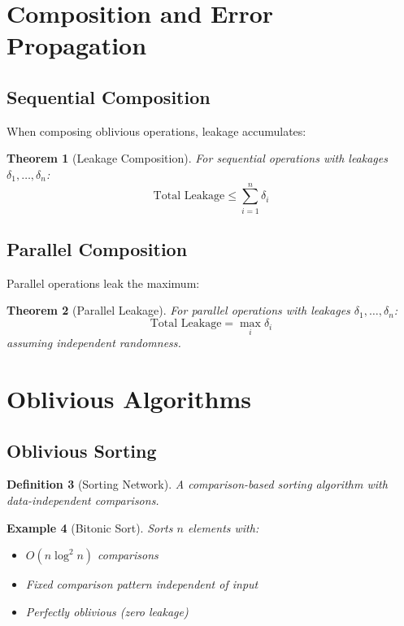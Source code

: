 \documentclass[11pt,final,hidelinks]{article}
\newtheorem{theorem}{Theorem}[section]
\newtheorem{definition}[theorem]{Definition}
\newtheorem{example}[theorem]{Example}
\begin{document}
\section{Composition and Error Propagation}

\subsection{Sequential Composition}

When composing oblivious operations, leakage accumulates:

\begin{theorem}[Leakage Composition]
For sequential operations with leakages $\delta_1, \ldots, \delta_n$:
\begin{equation}
\text{Total Leakage} \leq \sum_{i=1}^n \delta_i
\end{equation}
\end{theorem}

\subsection{Parallel Composition}

Parallel operations leak the maximum:

\begin{theorem}[Parallel Leakage]
For parallel operations with leakages $\delta_1, \ldots, \delta_n$:
\begin{equation}
\text{Total Leakage} = \max_{i} \delta_i
\end{equation}
assuming independent randomness.
\end{theorem}

\section{Oblivious Algorithms}

\subsection{Oblivious Sorting}

\begin{definition}[Sorting Network]
A comparison-based sorting algorithm with data-independent comparisons.
\end{definition}

\begin{example}[Bitonic Sort]
Sorts $n$ elements with:
\begin{itemize}
    \item $O(n \log^2 n)$ comparisons
    \item Fixed comparison pattern independent of input
    \item Perfectly oblivious (zero leakage)
\end{itemize}
\end{example}
\end{document}
